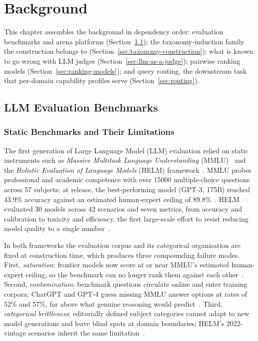 \chapter{Background}\label{ch:literature-review}

This chapter assembles the background in dependency order: evaluation
benchmarks and arena platforms (Section~\ref{sec:benchmarks}); the
taxonomy-induction family the construction belongs to
(Section~\ref{sec:taxonomy-construction}); what is known to go wrong
with LLM judges (Section~\ref{sec:llm-as-a-judge}); pairwise ranking
models (Section~\ref{sec:ranking-models}); and query routing, the
downstream task that per-domain capability profiles serve
(Section~\ref{sec:routing}).


\section{LLM Evaluation Benchmarks}\label{sec:benchmarks}

\subsection*{Static Benchmarks and Their Limitations}

The first generation of Large Language Model (LLM) evaluation relied
on static instruments such as \textit{Massive Multitask Language
Understanding} (MMLU)~\parencite{hendrycks2021measuring} and the
\textit{Holistic Evaluation of Language Models} (HELM)
framework~\parencite{liang2022holistic}. MMLU probes professional and
academic competence with over \num{15000} multiple-choice questions
across 57 subjects; at release, the best-performing model (GPT-3,
175B) reached 43.9\% accuracy against an estimated human-expert
ceiling of 89.8\%~\parencite{hendrycks2021measuring}. HELM evaluated
30 models across 42 scenarios and seven metrics, from accuracy and
calibration to toxicity and efficiency, the first large-scale effort
to resist reducing model quality to a single
number~\parencite{liang2022holistic}.

In both frameworks the evaluation corpus and its categorical
organisation are fixed at construction time, which produces three
compounding failure modes. First, \textit{saturation}: frontier
models now score at or near MMLU's estimated human-expert ceiling, so
the benchmark can no longer rank them against each
other~\parencite{hendrycks2021measuring, wang2024mmlupro}. Second,
\textit{contamination}: benchmark questions circulate online and
enter training corpora; ChatGPT and GPT-4 guess missing MMLU answer
options at rates of 52\% and 57\%, far above what genuine reasoning
would predict~\parencite{deng2024contamination}. Third,
\textit{categorical brittleness}: editorially defined subject
categories cannot adapt to new model generations and leave blind
spots at domain boundaries; HELM's 2022-vintage scenarios inherit the
same limitation~\parencite{liang2022holistic}.

